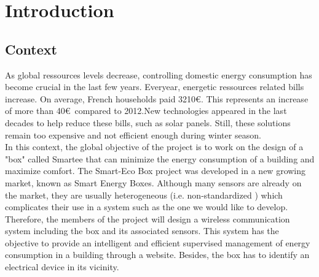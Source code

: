 %
%
\section{Introduction}

\subsection{Context}

As global ressources levels decrease, controlling domestic energy consumption has become crucial in the last few years. Everyear, energetic ressources related bills increase. On average, French households paid 3210\euro. This represents an increase of more than 40\euro\ compared to 2012.New technologies appeared in the last decades to help reduce these bills, such as solar panels. Still, these solutions remain too expensive and not efficient enough during winter season.\\


In this context, the global objective of the project is to work on the design of a "box" called Smartee that can minimize the energy consumption of a building and maximize comfort. The Smart-Eco Box project was developed in a new growing market, known as Smart Energy Boxes. Although many sensors are already on the market, they are usually heterogeneous (i.e. non-standardized ) which complicates their use in a system such as the one we would like to develop. Therefore, the members of the project will design a wireless communication system including the box and its associated sensors. This system has the objective to provide an intelligent and efficient supervised management of energy consumption in a building through a website. Besides, the box has to identify an electrical device in its vicinity.\\

